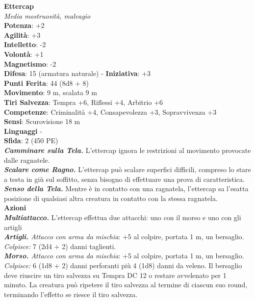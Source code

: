 \begin{multicols}{2}
\medskip\textbf{Ettercap}\\
\emph{Media mostruosità, malvagio}\\
\textbf{Potenza}: +2\\
\textbf{Agilità}: +3\\
\textbf{Intelletto}: -2\\
\textbf{Volontà}: +1\\
\textbf{Magnetismo}: -2\\
\textbf{Difesa}: 15 (armatura naturale) - \textbf{Iniziativa}: +3\\
\textbf{Punti Ferita}: 44 (8d8 + 8)\\
\textbf{Movimento}: 9 m, scalata 9 m\\
\textbf{Tiri Salvezza}: Tempra +6, Riflessi +4, Arbitrio +6\\
\textbf{Competenze}: Criminalità +4, Consapevolezza +3, Sopravvivenza +3\\
\textbf{Sensi}: Scurovisione 18 m\\
\textbf{Linguaggi} -\\
\textbf{Sfida}: 2 (450 PE)\smallskip\\
\emph{\textbf{Camminare sulla Tela.}} L'ettercap ignora le restrizioni al movimento provocate dalle ragnatele.\\
\emph{\textbf{Scalare come Ragno.}} L'ettercap può scalare superfici difficili, compreso lo stare a testa in giù sul soffitto, senza bisogno di effettuare una prova di caratteristica.\\
\emph{\textbf{Senso della Tela.}} Mentre è in contatto con una ragnatela, l'ettercap sa l'esatta posizione di qualsiasi altra creatura in contatto con la stessa ragnatela.\\
\smallskip\textbf{Azioni}\\
\emph{\textbf{Multiattacco.}} L'ettercap effettua due attacchi: uno con il morso e uno con gli artigli\\
\emph{\textbf{Artigli.} Attacco con arma da mischia}: +5 al colpire, portata 1 m, un bersaglio.\\
\emph{Colpisce:} 7 (2d4 + 2) danni taglienti.\\
\emph{\textbf{Morso.} Attacco con arma da mischia}: +5 al colpire, portata 1 m, un bersaglio.\\
\emph{Colpisce:} 6 (1d8 + 2) danni perforanti più 4 (1d8) danni da veleno. Il bersaglio deve riuscire un tiro salvezza su Tempra DC  12 o restare avvelenato per 1 minuto. La creatura può ripetere il tiro salvezza al termine di ciascun suo round, terminando l'effetto se riesce il tiro salvezza.\\

\end{multicols}
